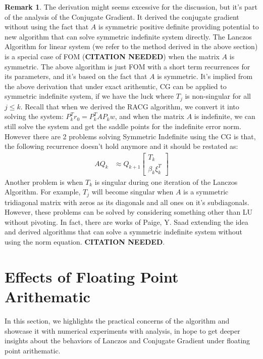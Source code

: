 \documentclass[]{article}
\theoremstyle{definition}
\newtheorem{remark}{Remark}[subsection]
\begin{document}
            \begin{remark}
                The derivation might seems excessive for the discussion, but it's part of the analysis of the Conjugate Gradient. It derived the conjugate gradient without using the fact that $A$ is symmetric positive definite providing potential to new algorithm that can solve symmetric indefinite system directly. The Lanczos Algorithm for linear system (we refer to the method derived in the above section) is a special case of FOM (\textbf{CITATION NEEDED}) when the matrix $A$ is symmetric. The above algorithm is just FOM with a short term recurrences for its parameters, and it's based on the fact that $A$ is symmetric. It's implied from the above derivation that under exact arithemtic, CG can be applied to symmetric indefinite system, if we have the luck where $T_j$ is non-singular for all $j\le k$. Recall that when we derived the RACG algorithm, we convert it into solving the system: $P^T_kr_0 = P_k^TAP_kw$, and when the matrix $A$ is indefinite, we can still solve the system and get the saddle points for the indefinite error norm. However there are 2 problems solving Symmetric Indefinite using the CG is that, the following recurrence doesn't hold anymore and it should be restated as: 
                \begin{align}
                    AQ_k &\approx Q_{k + 1}
                    \begin{bmatrix}
                        T_k \\ \beta_k \xi_k^T
                    \end{bmatrix}
                \end{align}
                Another problem is when $T_k$ is singular during one iteration of the Lanczos Algorithm. For example, $T_j$ will become singular when $A$ is a symmetric tridiagonal matrix with zeros as its diagonals and all ones on it's subdiagonals. However, these problems can be solved by considering something other than LU without pivoting. In fact, there are works of Paige, Y. Saad extending the idea and derived algorithms that can solve a symmetric indefinite system without using the norm equation. 
                \textbf{CITATION NEEDED}. 
            \end{remark}
        
\section{Effects of Floating Point Arithematic}
    In this section, we highlights the practical concerns of the algorithm and showcase it with numerical experiments with analysis, in hope to get deeper insights about the behaviors of Lanczos and Conjugate Gradient under floating point arithematic. 
\end{document}
